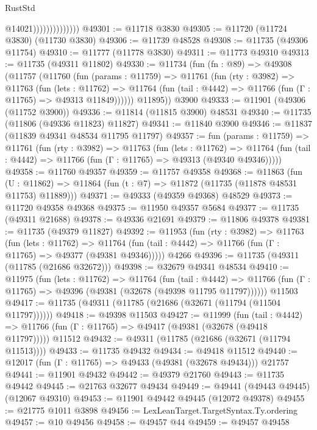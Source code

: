 \begin{lexlean}{RustStd}
\begin{coremodule}
                                @14021))))))))))))))
@49301 := @11718 @3830
@49305 := @11720 (@11724 @3830) (@11730 @3830)
@49306 := @11739 @48528
@49308 := @11735 (@49306 @11754)
@49310 := @11777 (@11778 @3830)
@49311 := @11773 @49310
@49313 := @11735 (@49311 @11802)
@49330 := @11734
    (fun (fn : @89) =>
    @49308
      (@11757
        (@11760
          (fun (params : @11759) =>
          @11761
            (fun (rty : @3982) =>
            @11763
              (fun (lets : @11762) =>
              @11764 (fun (tail : @4442) => @11766 (fun (Γ : @11765) => @49313 @11849))))))
        @11895))
    @3900
@49333 := @11901 (@49306 (@11752 @3900))
@49336 := @11814 (@11815 @3900) @48531
@49340 := @11735 (@11806 (@49336 @11823) @11827)
@49341 := @11840 @3900
@49346 := @11837 (@11839 @49341 @48534 @11795 @11797)
@49357 := fun (params : @11759) =>
  @11761
    (fun (rty : @3982) =>
    @11763
      (fun (lets : @11762) =>
      @11764 (fun (tail : @4442) => @11766 (fun (Γ : @11765) => @49313 (@49340 @49346)))))
@49358 := @11760 @49357
@49359 := @11757 @49358
@49368 := @11863
    (fun (U : @11862) => @11864 (fun (t : @7) => @11872 (@11735 (@11878 @48531 @11753) @11889)))
@49371 := @49333 (@49359 @49368) @48529
@49373 := @11720 @49358 @49368
@49375 := @11950 @49357 @5684
@49377 := @11735 (@49311 @21688)
@49378 := @49336 @21691
@49379 := @11806 @49378
@49381 := @11735 (@49379 @11827)
@49392 := @11953
    (fun (rty : @3982) =>
    @11763
      (fun (lets : @11762) =>
      @11764 (fun (tail : @4442) => @11766 (fun (Γ : @11765) => @49377 (@49381 @49346)))))
    @4266
@49396 := @11735 (@49311 (@11785 (@21686 @32672)))
@49398 := @32679 @49341 @48534
@49410 := @11975
    (fun (lets : @11762) =>
    @11764
      (fun (tail : @4442) =>
      @11766 (fun (Γ : @11765) => @49396 (@49381 (@32678 (@49398 @11795 @11797))))))
    @11503
@49417 := @11735 (@49311 (@11785 (@21686 (@32671 (@11794 (@11504 @11797))))))
@49418 := @49398 @11503
@49427 := @11999
    (fun (tail : @4442) => @11766 (fun (Γ : @11765) => @49417 (@49381 (@32678 (@49418 @11797)))))
    @11512
@49432 := @49311 (@11785 (@21686 (@32671 (@11794 @11513))))
@49433 := @11735 @49432
@49434 := @49418 @11512
@49440 := @12017 (fun (Γ : @11765) => @49433 (@49381 (@32678 @49434))) @21757
@49441 := @11901 @49432
@49442 := @49379 @21760
@49443 := @11735 @49442
@49445 := @21763 @32677 @49434
@49449 := @49441 (@49443 @49445) (@12067 @49310)
@49453 := @11901 @49442 @49445 (@12072 @49378)
@49455 := @21775 @1011 @3898
@49456 := LexLeanTarget.TargetSyntax.Ty.ordering
@49457 := @10 @49456
@49458 := @49457 @44
@49459 := @49457 @49458

\end{coremodule}
\end{lexlean}
